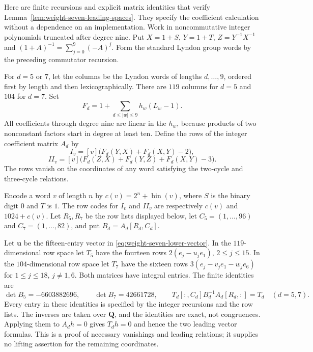 Here are finite recursions and explicit matrix identities that verify
Lemma~\ref{lem:weight-seven-leading-spaces}. They specify the
coefficient calculation without a dependence on an implementation.
Work in noncommutative integer polynomials truncated after degree
nine. Put $X=1+S$, $Y=1+T$, $Z=Y^{-1}X^{-1}$ and
$(1+A)^{-1}=\sum_{j=0}^{9}(-A)^j$. Form the standard Lyndon group
words by the preceding commutator recursion.

For $d=5$ or $7$, let the columns be the Lyndon words of lengths
$d,\ldots,9$, ordered first by length and then lexicographically.
There are $119$ columns for $d=5$ and $104$ for $d=7$. Set
\[
 F_d=1+\sum_{d\le |w|\le9}h_w(L_w-1).
\]
All coefficients through degree nine are linear in the $h_w$,
because products of two nonconstant factors start in degree at
least ten. Define the rows of the integer coefficient matrix $A_d$
by
\[
 I_v=[v]\bigl(F_d(Y,X)+F_d(X,Y)-2\bigr),
\]
\[
 II_v=[v]\bigl(F_d(Z,X)+F_d(Y,Z)+F_d(X,Y)-3\bigr).
\]
The rows vanish on the coordinates of any word satisfying
the two-cycle and three-cycle relations.

Encode a word $v$ of length $n$ by
$c(v)=2^n+\operatorname{bin}(v)$, where $S$ is the binary digit $0$
and $T$ is $1$. The row codes for $I_v$ and $II_v$ are respectively
$c(v)$ and $1024+c(v)$. Let $R_5,R_7$ be the row lists displayed
below, let $C_5=(1,\ldots,96)$ and $C_7=(1,\ldots,82)$, and put
$B_d=A_d[R_d,C_d]$.

Let $\mathbf u$ be the fifteen-entry vector in
\eqref{eq:weight-seven-lower-vector}. In the $119$-dimensional
row space let $T_5$ have the fourteen rows
$2(e_j-u_je_1)$, $2\le j\le15$. In the $104$-dimensional row
space let $T_7$ have the sixteen rows
$3(e_j-v_je_1-w_je_6)$ for $1\le j\le18$, $j\ne1,6$.
Both matrices have integral entries. The finite identities are
\begin{equation}\label{eq:weight-seven-finite-matrix-identity}
 \det B_5=-6603882696,\qquad \det B_7=42661728,
 \qquad
 T_d[:,C_d]B_d^{-1}A_d[R_d,:]=T_d\quad(d=5,7).
\end{equation}
Every entry in these identities is specified by the integer
recursions and the row lists. The inverses are taken over
$\mathbf Q$, and the identities are exact, not congruences.
Applying them to $A_dh=0$ gives $T_dh=0$ and hence the two leading
vector formulas. This is a proof of necessary vanishings and
leading relations; it supplies no lifting assertion for the
remaining coordinates.


